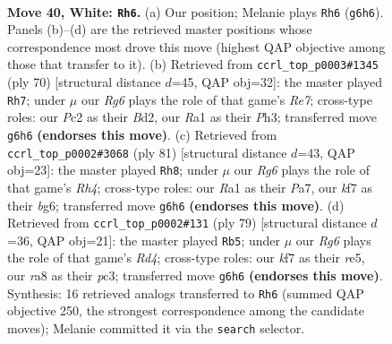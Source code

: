\documentclass[11pt]{article}
\begin{document}
\clearpage

\begin{figure}[p]\centering
\begin{subfigure}{0.46\textwidth}\centering
\resizebox{\linewidth}{!}{%
\newchessgame
\chessboard[
  setfen={r7/3b1k2/2n3R1/6B1/1p1p2P1/pP6/P1PN3K/R7 w - - 2 40},
  showmover=false,
  pgfstyle=straightmove, color=movearrow, markmove={g6-h6}
]}
\caption{}
\end{subfigure}\hfill
\begin{subfigure}{0.46\textwidth}\centering
\resizebox{\linewidth}{!}{%
\newchessgame
\chessboard[
  setfen={3r4/pp1nR3/5k1p/2p5/2Pp1P2/1P5P/P2BK3/8 w - - 8 36},
  showmover=false,
  pgfstyle=straightmove, color=movearrow, markmove={e7-h7}
]}
\caption{}
\end{subfigure}
\\[4pt]
\begin{subfigure}{0.46\textwidth}\centering
\resizebox{\linewidth}{!}{%
\newchessgame
\chessboard[
  setfen={3k4/p2n4/1p4B1/2pP3r/b1P2pNp/P6K/5P2/4R3 b - - 6 41},
  showmover=false,
  pgfstyle=straightmove, color=movearrow, markmove={h5-h8}
]}
\caption{}
\end{subfigure}\hfill
\begin{subfigure}{0.46\textwidth}\centering
\resizebox{\linewidth}{!}{%
\newchessgame
\chessboard[
  setfen={2n5/3b1pk1/1p4p1/3rR1P1/p7/P1P2NK1/1PB5/8 b - - 9 40},
  showmover=false,
  pgfstyle=straightmove, color=movearrow, markmove={d5-b5}
]}
\caption{}
\end{subfigure}
\caption{\textbf{Move 40, White: \texttt{Rh6}.} (a) Our position; Melanie plays \texttt{Rh6} (\texttt{g6h6}). Panels (b)--(d) are the retrieved master positions whose correspondence most drove this move (highest QAP objective among those that transfer to it). (b) Retrieved from \texttt{ccrl\_top\_p0003\#1345} (ply 70) [structural distance $d$=45, QAP obj=32]: the master played \texttt{Rh7}; under $\mu$ our \emph{Rg6} plays the role of that game's \emph{Re7}; cross-type roles: our \emph{P}c2 as their \emph{B}d2, our \emph{R}a1 as their \emph{P}h3; transferred move \texttt{g6h6} \textbf{(endorses this move)}. (c) Retrieved from \texttt{ccrl\_top\_p0002\#3068} (ply 81) [structural distance $d$=43, QAP obj=23]: the master played \texttt{Rh8}; under $\mu$ our \emph{Rg6} plays the role of that game's \emph{Rh4}; cross-type roles: our \emph{R}a1 as their \emph{P}a7, our \emph{k}f7 as their \emph{b}g6; transferred move \texttt{g6h6} \textbf{(endorses this move)}. (d) Retrieved from \texttt{ccrl\_top\_p0002\#131} (ply 79) [structural distance $d$=36, QAP obj=21]: the master played \texttt{Rb5}; under $\mu$ our \emph{Rg6} plays the role of that game's \emph{Rd4}; cross-type roles: our \emph{k}f7 as their \emph{r}e5, our \emph{r}a8 as their \emph{p}c3; transferred move \texttt{g6h6} \textbf{(endorses this move)}. Synthesis: 16 retrieved analogs transferred to \texttt{Rh6} (summed QAP objective 250, the strongest correspondence among the candidate moves); Melanie committed it via the \texttt{search} selector.}
\label{fig:thought-m78}
\end{figure}
\end{document}
